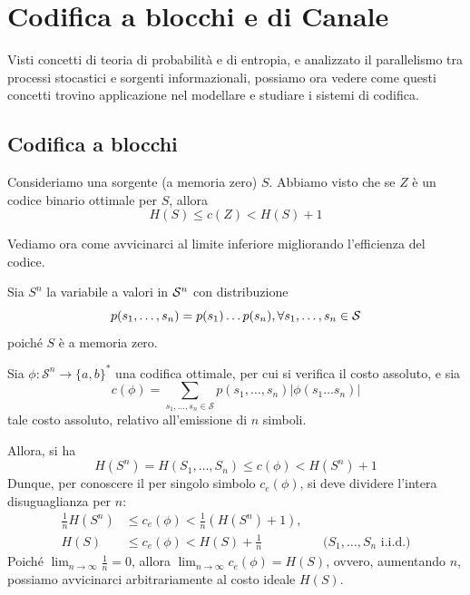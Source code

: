 \chapter{Codifica a blocchi e di Canale}

Visti concetti di teoria di probabilità e di entropia, e analizzato il parallelismo tra processi stocastici e sorgenti informazionali, possiamo ora vedere come questi concetti trovino applicazione nel modellare e studiare i sistemi di codifica.

\section{Codifica a blocchi}

Consideriamo una sorgente (a memoria zero) \(S\). Abbiamo visto che se \(Z\) è un codice binario ottimale per \(S\), allora
\[H(S)\leq c(Z)<H(S)+1\]

Vediamo ora come avvicinarci al limite inferiore migliorando l'efficienza del codice.

Sia \(S^n\) la variabile a valori in \(\mathcal{S}^n\) con distribuzione 
\[p(s_1, \ldots, s_n) = p(s_1)\ldots p(s_n), \forall s_1, \ldots, s_n \in \mathcal{S}\]
poiché $S$ è a memoria zero.

Sia $\phi:\mathcal{S}^{n}\to \{a,b\}^{*}$ una codifica ottimale, per cui si verifica il costo assoluto, e sia
$$c(\phi)=\sum_{s_{1},\dots,s_{n} \in \mathcal{S}}{p(s_{1},\dots, s_{n})|\phi(s_{1}\dots s_{n})|}$$
tale costo assoluto, relativo all'emissione di $n$ simboli.

Allora, si ha
$$H(S^{n})=H(S_{1},\dots,S_{n})\leq c(\phi) < H(S^{n})+1$$
Dunque, per conoscere il  per singolo simbolo $c_{e}(\phi)$, si deve dividere l'intera disuguaglianza per $n$:
$$\begin{aligned}
\frac{1}{n}H(S^{n}) &\leq c_{e}(\phi) < \frac{1}{n}(H(S^{n})+1), \\
H(S) &\leq c_{e}(\phi)< H(S) +\frac{1}{n} &&\text{($S_{1},\dots,S_{n}$ i.i.d.)}
\end{aligned}$$
Poiché $\lim_{ n \to \infty } \frac{1}{n}=0$, allora $\lim_{ n \to \infty }{c_{e}(\phi)}=H(S)$, ovvero, aumentando \(n\), possiamo avvicinarci arbitrariamente al costo ideale \(H(S)\).

